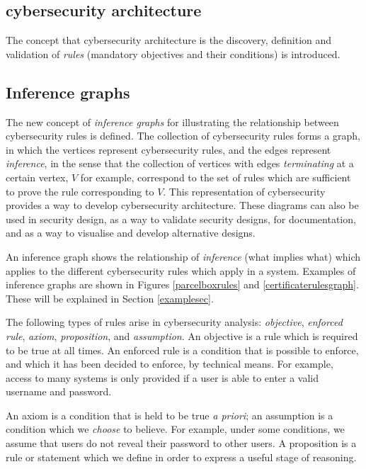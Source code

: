 \subsection{cybersecurity architecture}
The concept that cybersecurity architecture is the discovery, definition and validation of {\em rules} (mandatory objectives and their conditions) is introduced.

\subsection{Inference graphs}\label{inferencesec}
The new concept of {\em inference graphs} for illustrating the relationship between cybersecurity rules is defined. The collection of cybersecurity rules forms a graph, in which the vertices represent cybersecurity rules, and the edges represent {\em inference}, in the sense that the collection of vertices with edges {\em terminating} at a certain vertex, $V$ for example, correspond to the set of rules which are sufficient to prove the rule corresponding to $V$. This representation of cybersecurity provides a way to develop cybersecurity architecture\cite{Rerup2018}. These diagrams can also be used in security design, as a way to validate security designs, for documentation, and as a way to visualise and develop alternative designs.

An inference graph shows the relationship of {\em inference} (what implies what) which applies to the different cybersecurity rules which apply in a system.
Examples of inference graphs are shown in Figures \ref{parcelboxrules}  and \ref{certificaterulesgraph}. These will be explained in Section \ref{examplesec}.

The following types of rules arise in cybersecurity analysis: {\em objective}, {\em enforced rule}, {\em axiom}, {\em proposition}, and {\em assumption}. An objective is a rule which is required to be true at all times. An enforced rule is a condition that is possible to enforce, and which it has been decided to enforce, by technical means. For example, access to many systems is only provided if a user is able to enter a valid username and password.

An axiom is a condition that is held to be true {\em a priori}; an assumption is a condition which we {\em choose} to believe. For example, under some conditions, we assume that users do not reveal their password to other users. A proposition is a rule or statement which we define in order to express a useful stage of reasoning.

